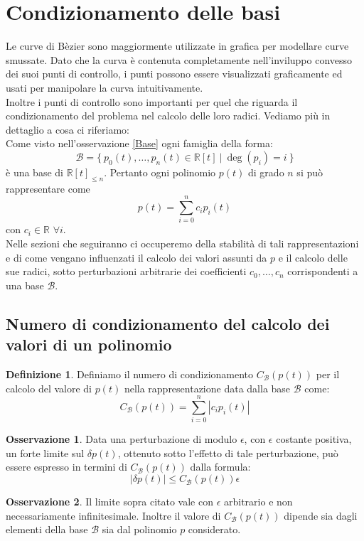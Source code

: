 \documentclass[a4paper,12pt]{report}
\theoremstyle{definition}
\newtheorem{defin}{Definizione}[chapter]
\newtheorem{oss}{Osservazione}[chapter]
\newcommand{\numberset}{\mathbb}
\newcommand{\R}{{\numberset{R}}}
\newcommand{\Calb}{{\mathcal{B}}}
\begin{document}
\section{Condizionamento delle basi}
Le curve di Bèzier sono maggiormente utilizzate in grafica per modellare curve smussate. Dato che la curva è contenuta completamente nell'inviluppo convesso dei suoi punti di controllo, i punti possono essere visualizzati graficamente ed usati per manipolare la curva intuitivamente.\\
Inoltre i punti di controllo sono importanti per quel che riguarda il condizionamento del problema nel calcolo delle loro radici. Vediamo più in dettaglio a cosa ci riferiamo:\\
Come visto nell'osservazione \ref{Base} ogni famiglia della forma: $$\mathcal{B} = \{\ p_0(t),\ldots ,p_n(t)\in\mathbb{R}[t]\ \big|\ \deg (p_i)=i \  \}$$
è una base di $\mathbb{R}[t]_{\le n}$. Pertanto	ogni polinomio $p(t)$ di grado $n$ si può rappresentare come$$p(t) = \sum_{i=0}^{n}c_i p_i(t)$$ 
con $c_i \in \R$ $\forall i $. \\
Nelle sezioni che seguiranno ci occuperemo della stabilità di tali rappresentazioni e di come vengano influenzati il calcolo dei valori assunti da $p$ e il calcolo delle sue radici, sotto perturbazioni arbitrarie dei coefficienti $c_0 , \ldots , c_n$ corrispondenti a una base $\mathcal{B}$.
\subsection{Numero di condizionamento del calcolo dei valori di un polinomio}
\begin{defin}
	Definiamo il numero di condizionamento $C_{\mathcal{B}}(p(t))$ per il calcolo del valore di $p(t)$ nella rappresentazione data dalla base $\mathcal{B}$ come:
	$$C_{\mathcal{B}}(p(t)) = \sum_{i=0}^{n} \left| c_ip_i(t)\right|$$
\end{defin}
\begin{oss}
	Data una perturbazione di modulo $\epsilon$, con $\epsilon$ costante positiva,
	un forte limite sul $\delta p(t)$, ottenuto sotto l'effetto di tale perturbazione, può essere espresso in termini di $C_{\mathcal{B}}(p(t))$ dalla formula:$$\left| \delta p(t) \right| \leq C_{\mathcal{B}}(p(t))\epsilon $$
\end{oss}
\begin{oss}
	Il limite sopra citato vale con $\epsilon$ arbitrario e non necessariamente infinitesimale. Inoltre il valore di $C_{\mathcal{B}}(p(t))$ dipende sia dagli elementi della base $\Calb$ sia dal polinomio $p$ considerato.
\end{oss}
\end{document}
